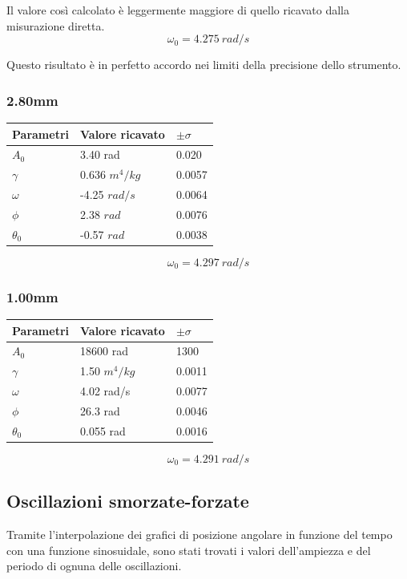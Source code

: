 \documentclass[a4paper,10pt]{report}
\begin{document}
Il valore così calcolato è leggermente maggiore di quello ricavato dalla misurazione diretta. $$\omega_{0} = 4.275\ rad/s$$

Questo risultato è in perfetto accordo nei limiti della precisione dello strumento.
\subsubsection{2.80mm}

\begin{center}
\begin{tabular}{l|l|l}
\midrule
Parametri & Valore ricavato & $ \pm \sigma$ \\
\midrule
$A_0$ & 3.40 rad & 0.020\\
$\gamma$ & 0.636 $m^4/kg$& 0.0057\\
$\omega$ & -4.25 $rad/s$& 0.0064\\
$\phi$ & 2.38 $rad$ & 0.0076 \\
$\theta_0$ & -0.57 $rad$& 0.0038 \\
\midrule
\end{tabular}
\end{center}

$$\omega_{0} = 4.297\ rad/s$$

\subsubsection{1.00mm}

\begin{center}
\begin{tabular}{l|l|l}
\midrule
Parametri & Valore ricavato & $ \pm \sigma$ \\
\midrule
$A_0$ & 18600 rad & 1300 \\
$\gamma$ & 1.50 $m^4/kg$& 0.0011\\
$\omega$ & 4.02 rad/s& 0.0077\\
$\phi$ & 26.3 rad & 0.0046 \\
$\theta_0$ & 0.055 rad& 0.0016 \\
\midrule
\end{tabular}
\end{center}

$$\omega_{0} = 4.291\ rad/s $$

\subsection{Oscillazioni smorzate-forzate}
Tramite l'interpolazione dei grafici di posizione angolare in funzione del tempo con una funzione sinosuidale, sono stati trovati i valori dell'ampiezza e del periodo di ognuna delle oscillazioni.
\end{document}
